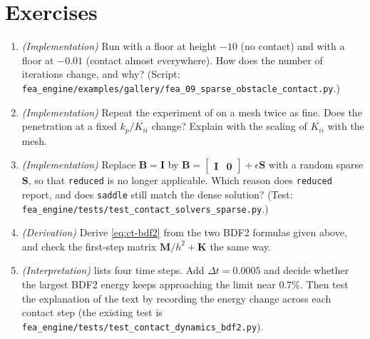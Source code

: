 \section*{Exercises}\label{sec:ct-exercises}
\begin{enumerate}
\item \emph{(Implementation)} Run  with a floor at height $-10$ (no contact) and with a floor at $-0.01$ (contact almost everywhere). How does the number of iterations change, and why? (Script: \texttt{fea\_engine/examples/gallery/fea\_09\_sparse\_obstacle\_contact.py}.)
\item \emph{(Implementation)} Repeat the experiment of  on a mesh twice as fine. Does the penetration at a fixed $k_p/\overline{K_{ii}}$ change? Explain with the scaling of $\overline{K_{ii}}$ with the mesh.
\item \emph{(Implementation)} Replace $\bm B=\bm I$ by $\bm B=\begin{bmatrix}\bm I&\bm 0\end{bmatrix}+\epsilon\bm S$ with a random sparse $\bm S$, so that \texttt{reduced} is no longer applicable. Which reason does \texttt{reduced} report, and does \texttt{saddle} still match the dense solution? (Test: \texttt{fea\_engine/tests/test\_contact\_solvers\_sparse.py}.)
\item \emph{(Derivation)} Derive \eqref{eq:ct-bdf2} from the two BDF2 formulas given above, and check the first-step matrix $\bm M/h^2+\bm K$ the same way.
\item \emph{(Interpretation)}  lists four time steps. Add $\Delta t=0.0005$ and decide whether the largest BDF2 energy keeps approaching the limit near $0.7\%$. Then test the explanation of the text by recording the energy change across each contact step (the existing test is \texttt{fea\_engine/tests/test\_contact\_dynamics\_bdf2.py}).
\end{enumerate}

\chapterrefs
